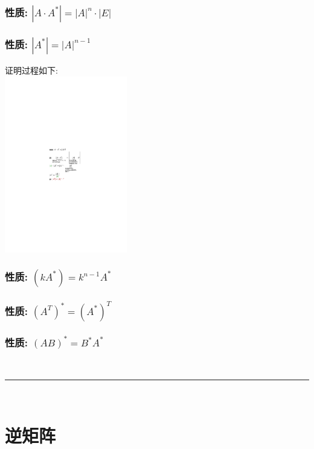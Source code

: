 \documentclass[UTF8]{ctexart}
\begin{document}
\subsubsection{性质: $|A\cdot A^*|=|A|^n\cdot |E|$ }

\subsubsection{性质: $|A^*|=|A|^{n-1}$ }

证明过程如下: \\
\includegraphics[width=0.4\textwidth]{img/0026.pdf}\\



\subsubsection{性质: $\left( kA^* \right) =k^{n-1}A^*$ }

\subsubsection{性质: $\left( A^T \right) ^*=\left( A^* \right) ^T$ }

\subsubsection{性质: $\left( AB \right) ^*=B^*A^*$ }



~\\
\hrule
~\\


\section{逆矩阵}
\end{document}
